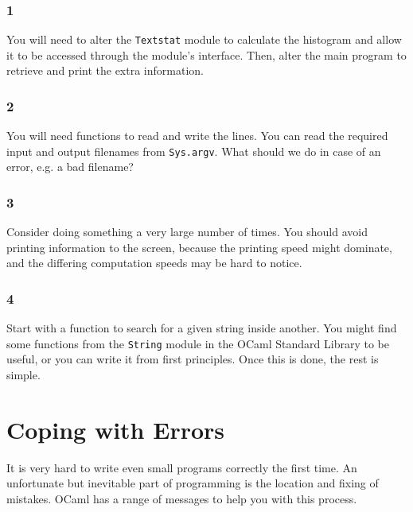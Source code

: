 \documentclass[]{book}
\begin{document}
\begin{multicols*}{2}
\section*{\\ }

\subsection*{1}
You will need to alter the \texttt{Textstat} module to calculate the histogram and allow it to be accessed through the module's interface. Then, alter the main program to retrieve and print the extra information.

\subsection*{2}
You will need functions to read and write the lines. You can read the required input and output filenames from \texttt{Sys.argv}. What should we do in case of an error, e.g. a bad filename?

\subsection*{3}
Consider doing something a very large number of times. You should avoid printing information to the screen, because the printing speed might dominate, and the differing computation speeds may be hard to notice.

\subsection*{4}
Start with a function to search for a given string inside another. You might find some functions from the \texttt{String} module in the OCaml Standard Library to be useful, or you can write it from first principles. Once this is done, the rest is simple.

\end{multicols*}

\cleardoublepage
\chapter{Coping with Errors}
It is very hard to write even small programs correctly the first time. An unfortunate but inevitable part of programming is the location and fixing of mistakes. OCaml has a range of messages to help you with this process.
\end{document}
